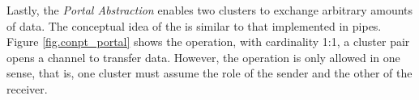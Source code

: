 			Lastly, the \textit{Portal Abstraction} enables two clusters to exchange arbitrary
			amounts of data.
			The conceptual idea of ​​the \portal is similar to that implemented in \posix pipes.
			Figure \ref{fig.conpt_portal} shows the \portal operation, with cardinality
			1:1, a cluster pair opens a channel to transfer data.
			However, the operation is only allowed in one sense, that is, one
			cluster must assume the role of the sender and the other of the receiver.
